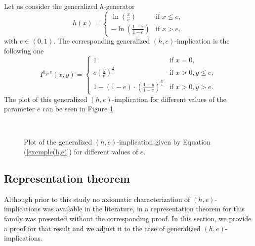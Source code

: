 \begin{example} Let us consider the generalized $h$-generator
	$$h(x)=
	\left\{ \begin{array}{ll}
		\ln \left(\frac{x}{e}\right) &   \text{if } x\leq e, \\
		-\ln \left( \frac{1-x}{1-e}\right) &   \text{if } x>e, 
	\end{array}
	\right.
	$$
	with $e \in (0,1)$. The corresponding generalized $(h,e)$-implication is the following one
	\begin{equation}
		I^{h_g,e}(x,y) = \left\{ \begin{array}{ll}
			1 &   \text{if } x=0, \\
			e\left(\frac{y}{e}\right)^{\frac{x}{e}} &   \text{if } x>0,y\leq e, \\
			1-(1-e)\cdot \left(\frac{1-y}{1-e}\right)^{\frac{e}{x}} &   \text{if } x>0,y>e. 
		\end{array}
		\right.
		\label{exemple(h,e)}
	\end{equation}
	The plot of this generalized $(h,e)$-implication for different values of the parameter $e$ can be seen in Figure \ref{exempl(h,e)}.
	\begin{figure}[H]
		\centering
		\\
		\caption[Plot of a generalized $(h,e)$-implication for different values of $e$.]{Plot of the generalized $(h,e)$-implication given by Equation (\ref{exemple(h,e)}) for different values of $e$.}\label{exempl(h,e)}
	\end{figure}
	\label{controlledincreasingness}
\end{example}

\subsection{Representation theorem}\label{subsection:representation_theorem}

Although prior to this study no axiomatic characterization of $(h,e)$-implications was available in the literature, in \cite{Massanet2013B} a representation theorem for this family was presented without the corresponding proof. In this section, we provide a proof for that result and we adjust it to the case of generalized $(h,e)$-implications.

